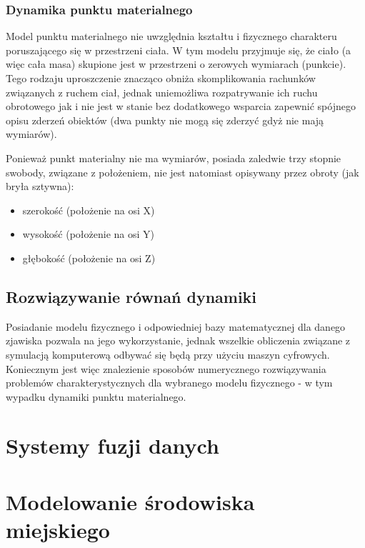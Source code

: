 \subsubsection{Dynamika punktu materialnego}
\par{
Model punktu materialnego nie uwzględnia kształtu i fizycznego charakteru poruszającego się w przestrzeni ciała. W tym modelu przyjmuje się, że ciało (a więc cała masa) skupione jest w przestrzeni o zerowych wymiarach (punkcie). Tego rodzaju uproszczenie znacząco obniża skomplikowania rachunków związanych z ruchem ciał, jednak uniemożliwa rozpatrywanie ich ruchu obrotowego jak i nie jest w stanie bez dodatkowego wsparcia zapewnić spójnego opisu zderzeń obiektów (dwa punkty nie mogą się zderzyć gdyż nie mają wymiarów).
}

\par{
Ponieważ punkt materialny nie ma wymiarów, posiada zaledwie trzy stopnie swobody, związane z położeniem, nie jest natomiast opisywany przez obroty (jak bryła sztywna):
\begin{itemize}
\item szerokość (położenie na osi X)
\item wysokość (położenie na osi Y)
\item głębokość (położenie na osi Z)
\end{itemize}
}

\subsection{Rozwiązywanie równań dynamiki}
\par{
Posiadanie modelu fizycznego i odpowiedniej bazy matematycznej dla danego zjawiska pozwala na jego wykorzystanie, jednak wszelkie obliczenia związane z symulacją komputerową odbywać się będą przy użyciu maszyn cyfrowych. Koniecznym jest więc znalezienie sposobów numerycznego rozwiązywania problemów charakterystycznych dla wybranego modelu fizycznego - w tym wypadku dynamiki punktu materialnego.
}

\section[Systemy fuzji danych][Systemy fuzji danych]{Systemy fuzji danych}
\section[Modelowanie środowiska miejskiego][Modelowanie środowiska miejskiego]{Modelowanie środowiska miejskiego}
